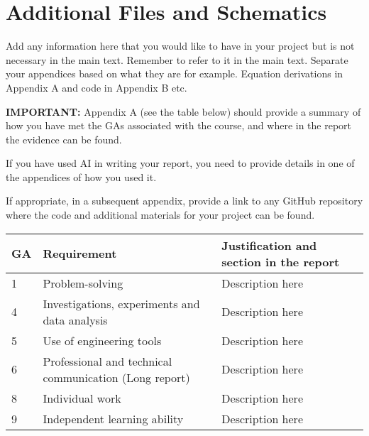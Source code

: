 \chapter{Additional Files and Schematics}

Add any information here that you would like to have in your project but is not necessary in the main
text. Remember to refer to it in the main text. Separate your appendices based on what they are for
example. Equation derivations in Appendix A and code in Appendix B etc.

\textbf{IMPORTANT:} Appendix A (see the table below) should provide a summary of how you have met the GAs associated with the course, and where in the report the evidence can be found.

If you have used AI in writing your report, you need to provide details in one of the appendices of how you used it.

If appropriate, in a subsequent appendix, provide a link to any GitHub repository where the code and additional materials for your project can be found.

\begin{center}
\begin{tabular}{||p{2em} |p{15em} |p{20em}||}
 \hline
 \textbf{GA} & \textbf{Requirement} & \textbf{Justification and section in the report}  \\ [0.5ex] 
 \hline\hline
 1 & Problem-solving & Description here  \\ 
 \hline
 4 & Investigations, experiments and data analysis & Description here  \\
 \hline
 5 & Use of engineering tools & Description here \\
 \hline
 6 & Professional and technical communication (Long report) & Description here \\
 \hline
 8 & Individual work & Description here \\
 \hline
 9 & Independent learning ability & Description here \\ [1ex] 
 \hline
\end{tabular}
\end{center}
